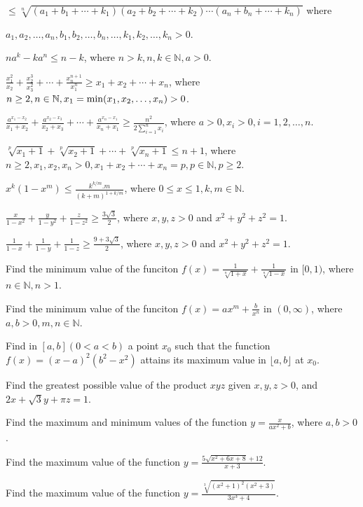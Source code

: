   $\leq\sqrt[n]{(a_1 + b_1 + \cdots + k_1)(a_2 + b_2 + \cdots + k_2)\cdots(a_n + b_n + \cdots + k_n)}$ where

  $a_1, a_2,\ldots, a_n, b_1, b_2, \ldots, b_n, \ldots, k_1, k_2, \ldots, k_n > 0$.
\item $na^k - ka^n\leq n - k$, where $n > k, n, k\in\mathbb{N}, a > 0$.
\item $\frac{x_1^2}{x_2} + \frac{x_2^3}{x_3^2} + \cdots + \frac{x_n^{n + 1}}{x_1^n}\geq x_1 + x_2 + \cdots + x_n$, where $n\geq 2,
  n\in\mathbb{N}, x_1 = {\rm min}(x_1, x_2, \ldots, x_n) > 0$.
\item $\frac{a^{x_1 - x_2}}{x_1 + x_2} + \frac{a^{x_2 - x_3}}{x_2 + x_3} + \cdots + \frac{a^{x_n - x_1}}{x_n +
  x_1}\geq \frac{n^2}{2\displaystyle\sum_{i=1}^nx_i}$, where $a > 0, x_i > 0, i = 1, 2, \ldots, n$.
\item $\sqrt[p]{x_1 + 1} + \sqrt[p]{x_2 + 1} + \cdots + \sqrt[p]{x_n + 1}\leq n + 1$, where $n\geq 2, x_1, x_2, x_n > 0, x_1 + x_2
  + \cdots + x_n = p, p\in\mathbb{N}, p\geq 2$.
\item $x^k(1 - x^m)\leq \frac{k^{k/m}.m}{(k + m)^{1 + k/m}}$, where $0\leq x\leq 1, k, m\in\mathbb{N}$.
\item $\frac{x}{1 - x^2} + \frac{y}{1 - y^2} + \frac{z}{1 - z^2}\geq \frac{3\sqrt{3}}{2}$, where $x, y, z > 0$ and $x^2 + y^2 + z^2
  = 1$.
\item $\frac{1}{1 - x} + \frac{1}{1 - y} + \frac{1}{1 - z}\geq \frac{9 + 3\sqrt{3}}{2}$, where $x, y, z > 0$ and $x^2 + y^2 + z^2
  = 1$.
\item Find the minimum value of the funciton $f(x) = \frac{1}{\sqrt[n]{1 + x}} + \frac{1}{\sqrt[n]{1 - x}}$ in $[0, 1)$, where
  $n\in\mathbb{N}, n > 1$.
\item Find the minimum value of the funciton $f(x) = ax^m + \frac{b}{x^n}$ in $(0, \infty)$, where $a, b > 0, m, n\in\mathbb{N}$.
\item Find in $[a, b] (0 < a < b)$ a point $x_0$ such that the function $f(x) = (x - a)^2(b^2 - x^2)$ attains its maximum value in
  $\lfloor a, b\rfloor$ at $x_0$.
\item Find the greatest possible value of the product $xyz$ given $x, y, z > 0$, and $2x + \sqrt{3}y + \pi z = 1$.
\item Find the maximum and minimum values of the function $y = \frac{x}{ax^2 + b}$, where $a, b > 0$.
\item Find the maximum value of the function $y = \frac{5\sqrt{x^2 + 6x + 8} + 12}{x + 3}$.
\item Find the maximum value of the function $y = \frac{\sqrt[3]{(x^2 + 1)^2(x^2 + 3)}}{3x^3 + 4}$.
